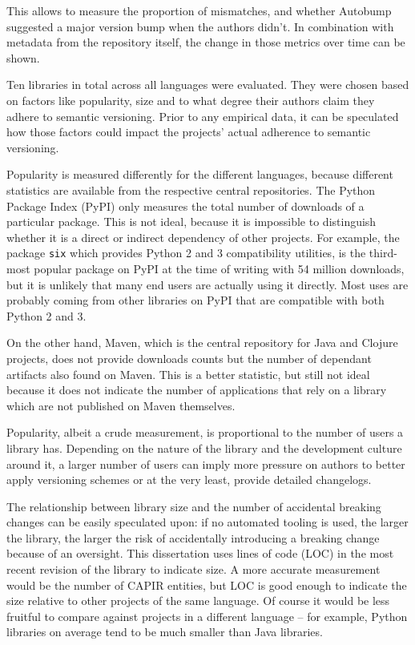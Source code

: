 \documentclass{l4proj}
\newcommand\genericstyle{\lstset{basicstyle=\ttm}}
\newcommand\codeinline[1]{{\genericstyle\lstinline!#1!}}
\begin{document}
This allows to measure the proportion of mismatches, and whether Autobump
suggested a major version bump when the authors didn't. In combination
with metadata from the repository itself, the change in those metrics
over time can be shown.

Ten libraries in total across all languages were evaluated. They were
chosen based on factors like popularity, size and to what degree their
authors claim they adhere to semantic versioning. Prior to any
empirical data, it can be speculated how those factors could impact
the projects' actual adherence to semantic versioning.

Popularity is measured differently for the different languages, because
different statistics are available from the respective central
repositories. The Python Package Index (PyPI) \cite{PyPI} only measures
the total number of downloads of a particular package. This is not
ideal, because it is impossible to distinguish whether it is a direct
or indirect dependency of other projects. For example, the package
\codeinline{six} which provides Python 2 and 3 compatibility
utilities, is the third-most popular package on PyPI at the time of
writing with 54 million downloads, but it is unlikely that many end
users are actually using it directly. Most uses are probably coming
from other libraries on PyPI that are compatible with both Python 2
and 3.

On the other hand, Maven, which is the central repository for Java and
Clojure projects, does not provide downloads counts but the number of
dependant artifacts also found on Maven. This is a better statistic,
but still not ideal because it does not indicate the number of
applications that rely on a library which are not published on Maven
themselves.

Popularity, albeit a crude measurement, is proportional to the number
of users a library has. Depending on the nature of the library and the
development culture around it, a larger number of users can imply more
pressure on authors to better apply versioning schemes or at the very
least, provide detailed changelogs.

The relationship between library size and the number of accidental
breaking changes can be easily speculated upon: if no automated
tooling is used, the larger the library, the larger the risk of
accidentally introducing a breaking change because of an oversight.
This dissertation uses lines of code (LOC) in the most recent revision
of the library to indicate size. A more accurate measurement would be
the number of CAPIR entities, but LOC is good enough to indicate the
size relative to other projects of the same language. Of course it
would be less fruitful to compare against projects in a different
language -- for example, Python libraries on average tend to be much
smaller than Java libraries.
\end{document}
